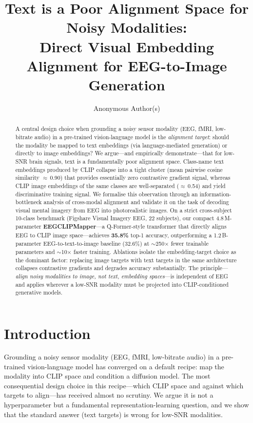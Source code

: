 \documentclass{article}
\title{Text is a Poor Alignment Space for Noisy Modalities:\\
Direct Visual Embedding Alignment for EEG-to-Image Generation}
\author{%
  Anonymous Author(s)\\
}
\begin{document}
\maketitle

\begin{abstract}
A central design choice when grounding a noisy sensor modality (EEG, fMRI, low-bitrate audio) in a pre-trained vision-language model is the \emph{alignment target}: should the modality be mapped to text embeddings (via language-mediated generation) or directly to image embeddings? We argue---and empirically demonstrate---that for low-SNR brain signals, text is a fundamentally poor alignment space. Class-name text embeddings produced by CLIP collapse into a tight cluster (mean pairwise cosine similarity $\approx$\,0.90) that provides essentially zero contrastive gradient signal, whereas CLIP image embeddings of the same classes are well-separated ($\approx$\,0.54) and yield discriminative training signal. We formalise this observation through an information-bottleneck analysis of cross-modal alignment and validate it on the task of decoding visual mental imagery from EEG into photorealistic images. On a strict cross-subject 10-class benchmark (Figshare Visual Imagery EEG, 22 subjects), our compact 4.8\,M-parameter \textbf{EEGCLIPMapper}---a Q-Former-style transformer that directly aligns EEG to CLIP image space---achieves \textbf{35.8\%} top-1 accuracy, outperforming a 1.2\,B-parameter EEG-to-text-to-image baseline (32.6\%) at $\sim$250$\times$ fewer trainable parameters and $\sim$10$\times$ faster training. Ablations isolate the embedding-target choice as the dominant factor: replacing image targets with text targets in the same architecture collapses contrastive gradients and degrades accuracy substantially. The principle---\emph{align noisy modalities to image, not text, embedding spaces}---is independent of EEG and applies wherever a low-SNR modality must be projected into CLIP-conditioned generative models.
\end{abstract}

\section{Introduction}

Grounding a noisy sensor modality (EEG, fMRI, low-bitrate audio) in a pre-trained vision-language model has converged on a default recipe: map the modality into CLIP space and condition a diffusion model. The most consequential design choice in this recipe---which CLIP space and against which targets to align---has received almost no scrutiny. We argue it is not a hyperparameter but a fundamental representation-learning question, and we show that the standard answer (text targets) is wrong for low-SNR modalities.
\end{document}
